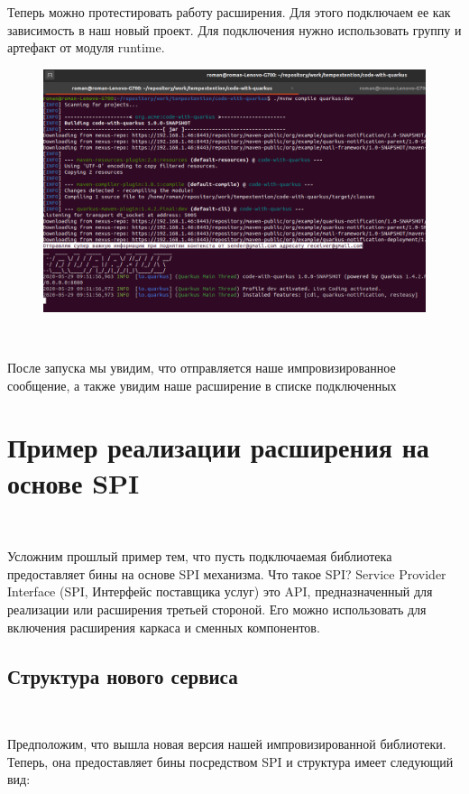 \documentclass[russian,11pt]{article}
\begin{document}
Теперь можно протестировать работу расширения. Для этого подключаем ее как зависимость в наш новый проект. Для подключения нужно использовать группу и артефакт от модуля runtime.

\begin{figure}[H]
	\centering
	\includegraphics[width=\textwidth]{11}
\end{figure}
~

После запуска мы увидим, что отправляется наше импровизированное сообщение, а также увидим наше расширение в списке подключенных

\section{Пример реализации расширения на основе SPI}
~

Усложним прошлый пример тем, что пусть подключаемая библиотека предоставляет бины на основе SPI механизма. Что такое SPI? Service Provider Interface (SPI, Интерфейс поставщика услуг) это API, предназначенный для реализации или расширения третьей стороной. Его можно использовать для включения расширения каркаса и сменных компонентов. 
\newpage
\subsection{Структура нового сервиса}
~

Предположим, что вышла новая версия нашей импровизированной библиотеки. Теперь, она предоставляет бины посредством SPI и структура имеет следующий вид:
\end{document}
